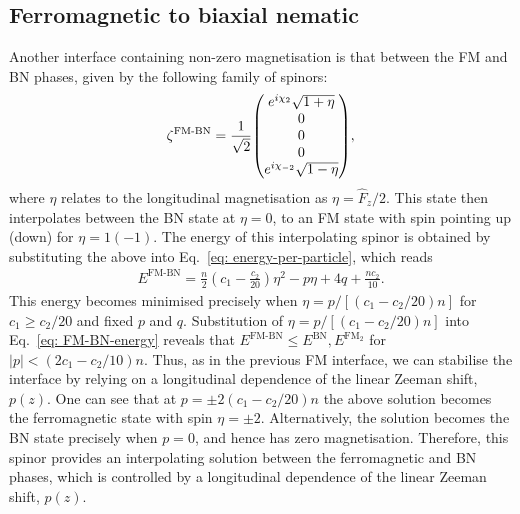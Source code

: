 \subsection{Ferromagnetic to biaxial nematic}
Another interface containing non-zero magnetisation is that between the FM and
BN phases, given by the following family of spinors:
\begin{align}\label{eq: FM-BN-interpolating-spinor}
    \zeta^\text{FM-BN} = \frac{1}{\sqrt{2}}\mqty(
    e^{i\chi_2} \sqrt{1 + \eta} \\
    0 \\
    0 \\
    0 \\
    e^{i\chi_{-2}} \sqrt{1 - \eta}),
\end{align}
where \(\eta \) relates to the longitudinal magnetisation as \(\eta =
\hat{F}_z / 2\).
This state then interpolates between the BN state at \(\eta = 0\), to an FM
state with spin pointing up (down) for \(\eta = 1 (-1)\).
The energy of this interpolating spinor is obtained by substituting the above
into Eq.~\eqref{eq: energy-per-particle}, which reads
\begin{align}\label{eq: FM-BN-energy}
    E^\text{FM-BN} = \frac{n}{2}\left(c_1-\frac{c_2}{20}\right)\eta^2
    - p \eta + 4q + \frac{nc_2}{10}.
\end{align}
This energy becomes minimised precisely when \(\eta = p / [(c_1-c_2/20)n]\) for
\(c_1 \geq c_2/20\) and fixed \(p\) and \(q\).
Substitution of \(\eta = p / [(c_1-c_2/20)n]\) into Eq.~\eqref{eq: FM-BN-energy}
reveals that \(E^\text{FM-BN} \leq E^\text{BN},
E^{\text{FM}_2}\) for \(|p| < (2c_1-c_2/10)n\).
Thus, as in the previous FM interface, we can stabilise the interface by relying
on a longitudinal dependence of the linear Zeeman shift, \(p(z)\).
One can see that at \(p = \pm 2(c_1-c_2/20)n\) the above solution becomes
the ferromagnetic state with spin \(\eta = \pm 2\).
Alternatively, the solution becomes the BN state precisely when \(p=0\), and
hence has zero magnetisation.
Therefore, this spinor provides an interpolating solution between the
ferromagnetic and BN phases, which is controlled by a longitudinal dependence of
the linear Zeeman shift, \(p(z)\).

